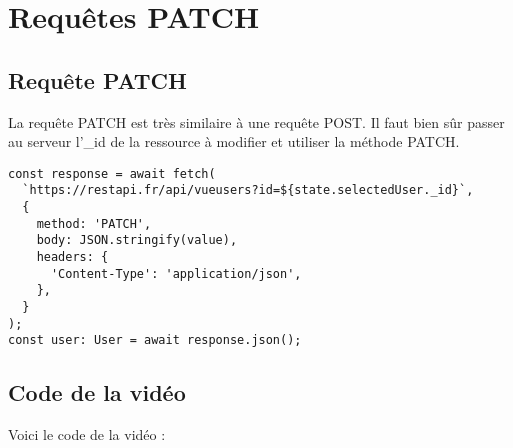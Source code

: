
\section{Requêtes  PATCH}
\subsection{Requête {\color{monOrange}PATCH}}
La requête {\color{monOrange}PATCH} est très similaire à une requête {\color{monOrange}POST}. Il faut bien sûr passer au serveur l'{\color{monOrange}\_id} de la ressource à modifier et utiliser la méthode {\color{monOrange}PATCH}.
\begin{verbatim}
const response = await fetch(
  `https://restapi.fr/api/vueusers?id=${state.selectedUser._id}`,
  {
    method: 'PATCH',
    body: JSON.stringify(value),
    headers: {
      'Content-Type': 'application/json',
    },
  }
);
const user: User = await response.json();
\end{verbatim} 

\subsection{Code de la vidéo}
Voici le code de la vidéo :

